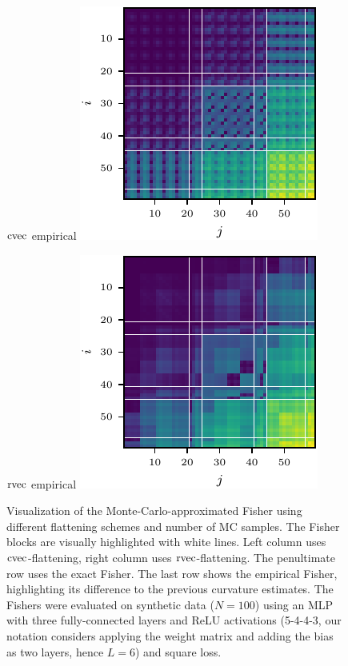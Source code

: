 \begin{figure}
  \begin{minipage}[t]{0.495\linewidth}
    \centering
    $\operatorname{cvec}$ empirical\vspace{1ex}
    \includegraphics[width=0.8\linewidth]{../kfs/plots/synthetic_cvec_empfisher.pdf}
  \end{minipage}
  \hfill
  \begin{minipage}[t]{0.495\linewidth}
    \centering
    $\operatorname{rvec}$ empirical\vspace{1ex}
    \includegraphics[width=0.8\linewidth]{../kfs/plots/synthetic_rvec_empfisher.pdf}
  \end{minipage}
  \caption{Visualization of the Monte-Carlo-approximated Fisher using different flattening schemes and number of MC samples.
    The Fisher blocks are visually highlighted with white lines.
    Left column uses $\operatorname{cvec}$-flattening, right column uses $\operatorname{rvec}$-flattening.
    The penultimate row uses the exact Fisher. The last row shows the empirical Fisher, highlighting its difference to the previous curvature estimates.
    The Fishers were evaluated on synthetic data ($N=100$) using an MLP with three fully-connected layers and ReLU activations (5-4-4-3, our notation considers applying the weight matrix and adding the bias as two layers, hence $L=6$) and square loss.
  }
  \label{fig:various_synthetic_fisher}
\end{figure}
